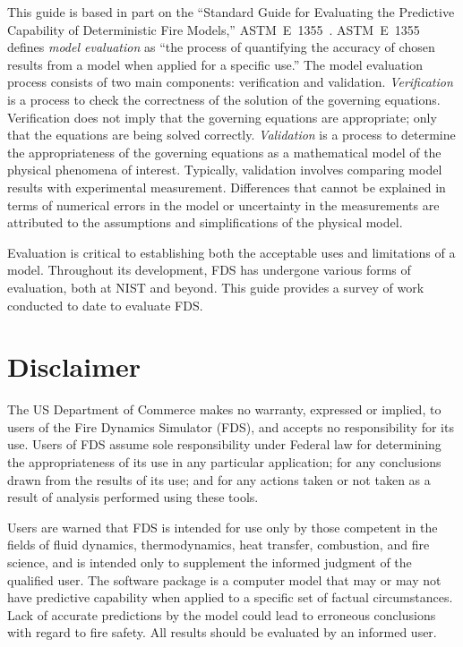 \documentclass[11pt]{book}
\begin{document}
This guide is based in part on the ``Standard Guide for
Evaluating the Predictive Capability of Deterministic Fire Models,'' ASTM~E~1355~\cite{ASTM:E1355}.
ASTM~E~1355 defines {\em model evaluation} as ``the process of quantifying
the accuracy of chosen results from a model when applied for a specific use.''
The model evaluation process consists of two main components: verification and validation.
{\em Verification} is a process to check the correctness of the solution of the
governing equations. Verification does not imply that the governing equations are
appropriate; only that the equations are being solved correctly.
{\em Validation} is a process to determine the appropriateness of the governing equations as a mathematical
model of the physical phenomena of interest. Typically, validation involves comparing
model results with experimental measurement. Differences that cannot be explained in terms of
numerical errors in the model or uncertainty in the measurements
are attributed to the assumptions and simplifications of the physical model.

Evaluation is critical to establishing both the acceptable uses
and limitations of a model. Throughout its development, FDS has undergone various forms of evaluation,
both at NIST and beyond. This guide provides a survey of work conducted to date to evaluate FDS.



\chapter{Disclaimer}

The US Department of Commerce makes no warranty, expressed or implied,
to users of the Fire Dynamics Simulator (FDS), and accepts no responsibility for its use.
Users of FDS assume sole responsibility under Federal law for determining
the appropriateness of its use in any particular application;
for any conclusions drawn from the results of its use; and for any
actions taken or not taken as a result of analysis performed using
these tools.

Users are warned that FDS is intended for use only by those competent
in the fields of fluid dynamics, thermodynamics, heat transfer,
combustion, and fire science, and is intended only to supplement the
informed judgment of the qualified user. The software package is a
computer model that may or may not have predictive capability when
applied to a specific set of factual circumstances. Lack of accurate
predictions by the model could lead to erroneous conclusions with
regard to fire safety. All results should be evaluated by an informed
user.
\end{document}
